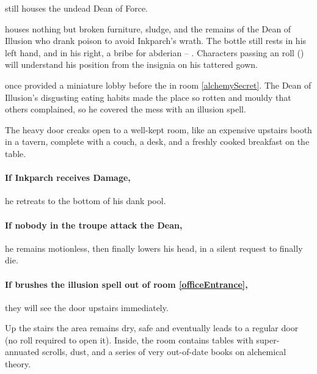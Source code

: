 \setcounter{enumi}{\value{list}}
\begin{list}{Room\space{}.\space}{}
  \item
  still houses the undead Dean of Force.
  \label{deanRoom}
  \item
  houses nothing but broken furniture, sludge, and the remains of the Dean of Illusion who drank poison to avoid Inkparch's wrath.
  The bottle still rests in his left hand, and in his right, a bribe for \gls{abderian} -- \lootBig.
  Characters passing an  roll (\tn[13]) will understand his position from the insignia on his tattered gown.
  \label{deadIllusionist}
  \item
  once provided a miniature lobby before the  in room \ref{alchemySecret}.
  The Dean of Illusion's disgusting eating habits made the place so rotten and mouldy that others complained, so he covered the mess with an illusion \gls{spell}.
  \label{officeEntrance}
  \begin{boxtext}
    The heavy door creaks open to a well-kept room, like an expensive upstairs booth in a tavern, complete with a couch, a desk, and a freshly cooked breakfast on the table.
  \end{boxtext}
\end{list}

\paragraph{If Inkparch receives Damage,}
he retreats to the bottom of his dank pool.

\paragraph{If nobody in the troupe attack the Dean,}
he remains motionless, then finally lowers his head, in a silent request to finally die.

\paragraph{If  brushes the illusion \gls{spell} out of room \ref{officeEntrance},}
they will see the door upstairs immediately.


Up the stairs the area remains dry, safe and eventually leads to a regular door (no roll required to open it).
Inside, the room contains tables with super-annuated scrolls, dust, and a series of very out-of-date books on alchemical theory.

